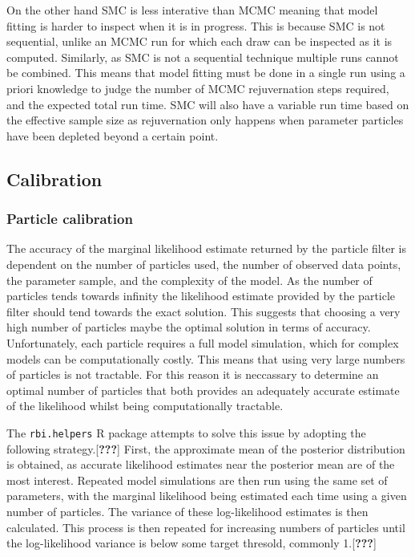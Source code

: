 \documentclass[11pt,twoside]{bristolthesis}
\begin{document}
  On the other hand SMC is less interative than MCMC meaning that model fitting is harder to inspect when it is in progress. This is because SMC is not sequential, unlike an MCMC run for which each draw can be inspected as it is computed. Similarly, as SMC is not a sequential technique multiple runs cannot be combined. This means that model fitting must be done in a single run using a priori knowledge to judge the number of MCMC rejuvernation steps required, and the expected total run time. SMC will also have a variable run time based on the effective sample size as rejuvernation only happens when parameter particles have been depleted beyond a certain point.
  
  \hypertarget{calibration}{%
  \subsection{Calibration}\label{calibration}}
  
  \hypertarget{particle-calibration}{%
  \subsubsection{Particle calibration}\label{particle-calibration}}
  
  The accuracy of the marginal likelihood estimate returned by the particle filter is dependent on the number of particles used, the number of observed data points, the parameter sample, and the complexity of the model. As the number of particles tends towards infinity the likelihood estimate provided by the particle filter should tend towards the exact solution. This suggests that choosing a very high number of particles maybe the optimal solution in terms of accuracy. Unfortunately, each particle requires a full model simulation, which for complex models can be computationally costly. This means that using very large numbers of particles is not tractable. For this reason it is neccassary to determine an optimal number of particles that both provides an adequately accurate estimate of the likelihood whilst being computationally tractable.
  
  The \texttt{rbi.helpers} R package attempts to solve this issue by adopting the following strategy.{[}{\textbf{???}}{]} First, the approximate mean of the posterior distribution is obtained, as accurate likelihood estimates near the posterior mean are of the most interest. Repeated model simulations are then run using the same set of parameters, with the marginal likelihood being estimated each time using a given number of particles. The variance of these log-likelihood estimates is then calculated. This process is then repeated for increasing numbers of particles until the log-likelihood variance is below some target thresold, commonly 1.{[}{\textbf{???}}{]}
  
\end{document}
